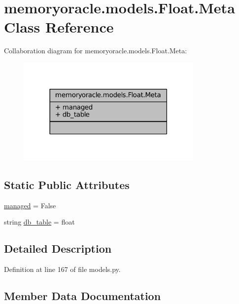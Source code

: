 \hypertarget{classmemoryoracle_1_1models_1_1Float_1_1Meta}{}\section{memoryoracle.\+models.\+Float.\+Meta Class Reference}
\label{classmemoryoracle_1_1models_1_1Float_1_1Meta}


Collaboration diagram for memoryoracle.\+models.\+Float.\+Meta\+:
\nopagebreak
\begin{figure}[H]
\begin{center}
\leavevmode
\includegraphics[width=258pt]{classmemoryoracle_1_1models_1_1Float_1_1Meta__coll__graph}
\end{center}
\end{figure}
\subsection*{Static Public Attributes}
\begin{DoxyCompactItemize}
\item 
\hyperlink{classmemoryoracle_1_1models_1_1Float_1_1Meta_a1d52dd406f079bc52ac4caac33ee8ec0}{managed} = False
\item 
string \hyperlink{classmemoryoracle_1_1models_1_1Float_1_1Meta_af2c7cc03305cab2473d128446b102a50}{db\+\_\+table} = \textquotesingle{}float\textquotesingle{}
\end{DoxyCompactItemize}


\subsection{Detailed Description}


Definition at line 167 of file models.\+py.



\subsection{Member Data Documentation}
\hypertarget{classmemoryoracle_1_1models_1_1Float_1_1Meta_af2c7cc03305cab2473d128446b102a50}{}
